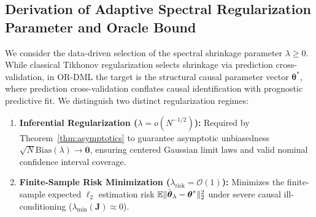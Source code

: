 \subsection{Derivation of Adaptive Spectral Regularization Parameter and Oracle Bound}
\label{app:adaptive_lambda_derivation}
We consider the data-driven selection of the spectral shrinkage parameter $\lambda \ge 0$. While classical Tikhonov regularization selects shrinkage via prediction cross-validation, in OR-DML the target is the structural causal parameter vector $\boldsymbol{\theta}^*$, where prediction cross-validation conflates causal identification with prognostic predictive fit.
We distinguish two distinct regularization regimes:
\begin{enumerate}
    \item \textbf{Inferential Regularization ($\lambda = o(N^{-1/2})$):} Required by Theorem~\ref{thm:asymptotics} to guarantee asymptotic unbiasedness $\sqrt{N}\mathrm{Bias}(\lambda) \to \mathbf{0}$, ensuring centered Gaussian limit laws and valid nominal confidence interval coverage.
    \item \textbf{Finite-Sample Risk Minimization ($\lambda_{\mathrm{risk}} = \mathcal{O}(1)$):} Minimizes the finite-sample expected $\ell_2$ estimation risk $\mathbb{E}\|\hat{\boldsymbol{\theta}}_\lambda - \boldsymbol{\theta}^*\|_2^2$ under severe causal ill-conditioning ($\lambda_{\min}(\boldsymbol{J}) \approx 0$).
\end{enumerate}

